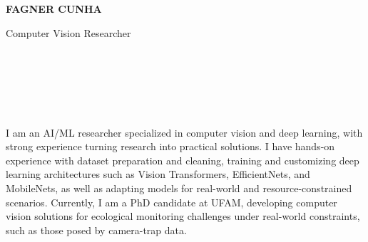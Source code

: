 \documentclass[10pt]{developercv} %
\begin{document}
\begin{minipage}[t]{0.6\textwidth}
  \vspace{-\baselineskip} %

  {\HUGE\textbf{\MakeUppercase{Fagner Cunha}}}
  \vspace{5pt}

  {\Large Computer Vision Researcher} %

  \\

\end{minipage}
\begin{minipage}[t]{0.3\textwidth}
  \vspace{-\baselineskip} %

 \\
\\ \\
\end{minipage}

\vspace{0.5cm}


\begin{minipage}[t]{\textwidth}

I am an AI/ML researcher specialized in computer vision and deep learning, with
strong experience turning research into practical solutions. I have hands-on
experience with dataset preparation and cleaning, training and customizing deep
learning architectures such as Vision Transformers, EfficientNets, and
MobileNets, as well as adapting models for real-world and resource-constrained
scenarios. Currently, I am a PhD candidate at UFAM, developing computer vision
solutions for ecological monitoring challenges under real-world constraints,
such as those posed by camera-trap data. \\

\end{minipage}
\end{document}
